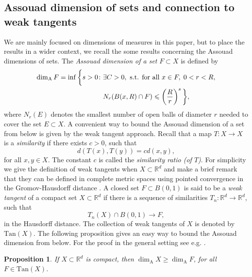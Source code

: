 \documentclass{PRM}
\newcommand{\field}[1]{\mathbb{#1}}
\newcommand{\R}{\field{R}}
\newcommand{\adim}{\dim_{\mathrm{A}}}
\theoremstyle{plain}
\newtheorem{prop}[thm]{Proposition}
\theoremstyle{definition}
\theoremstyle{remark}
\begin{document}
\subsection{Assouad dimension of sets and connection to weak tangents}
We are mainly focused on dimensions of measures in this paper, but to place the results in a wider context, we recall the some results concerning the Assouad dimensions of sets. The \emph{Assouad dimension of a set} $F\subset X$ is defined by
\begin{align*}
    \adim F=\inf\bigg\{ s>0\colon& \exists C>0,\textnormal{ s.t. for all }x\in F,\; 0<r<R,\\
    &N_r(B(x,R)\cap F)\leq \left(\frac{R}{r}\right)^s\bigg\},
\end{align*}
where $N_r(E)$ denotes the smallest number of open balls of diameter $r$ needed to cover the set $E\subset X$.  A convenient way to bound the Assouad dimension of a set from below is given by the weak tangent approach. Recall that a map $T\colon X\to X$ is a \emph{similarity} if there exists $c>0$, such that
\begin{equation*}
    d(T(x),T(y))=c d(x,y),
\end{equation*}
for all $x,y\in X$. The constant $c$ is called the \emph{similarity ratio (of $T$)}.  For simplicity we give the definition of weak tangents when $X\subset \R^d$ and make a brief remark that they can be defined in complete metric spaces using pointed convergence in the Gromov-Hausdorff distance \cite{KL,MT}.  A closed set $F\subset B(0,1)$ is said to be a \emph{weak tangent} of a compact set $X\subset \R^d$ if there is a sequence of similarities $T_n\colon \R^d\to\R^d$, such that
\begin{equation*}
    T_n(X)\cap B(0,1)\to F,
\end{equation*}
in the Hausdorff distance. The collection of weak tangents of $X$ is denoted by $\mathrm{Tan}(X)$. The following proposition gives an easy way to bound the Assouad dimension from below. For the proof in the general setting see e.g. \cite[Proposition 6.1.5]{MT}.

\begin{prop}\label{prop:weaktangent}
If $X\subset \R^d$ is compact, then $\dim_{\mathrm{A}} X\geq \dim_{\mathrm{A}}F$, for all $F\in\mathrm{Tan}(X)$.
\end{prop}
\end{document}
